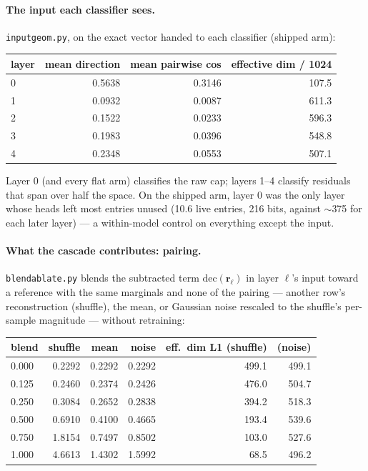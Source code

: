 \paragraph{The input each classifier sees.} \texttt{inputgeom.py}, on the
exact vector handed to each classifier (shipped arm):

\begin{center}\small
\begin{tabular}{@{}lrrr@{}}
\toprule
layer & mean direction & mean pairwise cos & effective dim / 1024 \\
\midrule
0 & 0.5638 & 0.3146 & 107.5 \\
1 & 0.0932 & 0.0087 & 611.3 \\
2 & 0.1522 & 0.0233 & 596.3 \\
3 & 0.1983 & 0.0396 & 548.8 \\
4 & 0.2348 & 0.0553 & 507.1 \\
\bottomrule
\end{tabular}
\end{center}

Layer 0 (and every flat arm) classifies the raw cap; layers 1--4 classify
residuals that span over half the space. On the shipped arm, layer 0 was
the only layer whose heads left most entries unused (10.6 live entries, 216 bits,
against $\sim$375 for each later layer) --- a within-model control on
everything except the input.

\paragraph{What the cascade contributes: pairing.}
\texttt{blendablate.py} blends the subtracted term
$\mathrm{dec}(\mathbf{r}_\ell)$ in layer $\ell$'s input toward a reference with
the same marginals and none of the pairing --- another row's
reconstruction (shuffle), the mean, or Gaussian noise rescaled to the
shuffle's per-sample magnitude --- without retraining:

\begin{center}\small
\begin{tabular}{@{}lrrrrr@{}}
\toprule
blend & shuffle & mean & noise & eff.\ dim L1 (shuffle) & (noise) \\
\midrule
0.000 & 0.2292 & 0.2292 & 0.2292 & 499.1 & 499.1 \\
0.125 & 0.2460 & 0.2374 & 0.2426 & 476.0 & 504.7 \\
0.250 & 0.3084 & 0.2652 & 0.2838 & 394.2 & 518.3 \\
0.500 & 0.6910 & 0.4100 & 0.4665 & 193.4 & 539.6 \\
0.750 & 1.8154 & 0.7497 & 0.8502 & 103.0 & 527.6 \\
1.000 & 4.6613 & 1.4302 & 1.5992 & 68.5 & 496.2 \\
\bottomrule
\end{tabular}
\end{center}

